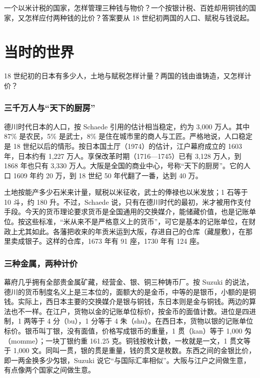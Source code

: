 一个以米计税的国家，怎样管理三种钱与物价？一个按银计税、百姓却用铜钱的国家，又怎样应付两种钱的比价？答案要从 18 世纪初两国的人口、赋税与钱说起。

\section{当时的世界}\label{sec:toku-world}

18 世纪初的日本有多少人，土地与赋税怎样计量？两国的钱由谁铸造，又怎样计价？

\subsubsection{三千万人与“天下的厨房”}
德川时代日本的人口，按 Schaede 引用的估计相当稳定，约为 3,000 万人。其中 87\% 是农民，5\% 是武士，8\% 是住在城市里的商人与工匠\cite{schaede1989}。严格地说，人口稳定是 18 世纪以后的情形。按日本国土厅（1974）的估计，江户幕府成立的 1603 年，日本约有 1,227 万人。享保改革时期（1716—1745）已有 3,128 万人，到 1868 年也只有 3,330 万人\cite{mlit2011}。大阪是全国的商业中心，号称“天下的厨房”。它的人口 1609 年约 20 万，到 18 世纪 50 年代翻了一番，达到 40 万\cite{schaede1989}。

土地按能产多少石米来计量，赋税以米征收，武士的俸禄也以米发放；1 石等于 10 斗，约 180 升\cite{schaede1989}。不过，Schaede 说，只有在德川时代的最初，米才被用作支付手段。今天的货币理论要求货币是全国通用的交换媒介，能储藏价值，也是记账单位。按这些标准，“米从来不是严格意义上的货币”，可它是基本的记账单位，在财政上尤其如此\cite{schaede1989}。各藩把收来的年贡米运到大阪，存进自己的仓库（藏屋敷），在那里卖成银子。这样的仓库，1673 年有 91 座，1730 年有 124 座\cite{schaede1989}。

\subsubsection{三种金属，两种计价}
幕府几乎拥有全部贵金属矿藏，经营金、银、铜三种铸币厂\cite{suzuki2021}。按 Suzuki 的说法，德川的货币制度名义上是三本位的，面额大的是金币，中等的是银币，小额的是铜钱。实际上，西日本主要的交换媒介是银与铜钱，东日本则是金与铜钱\cite{suzuki2021}。两边的算法也不一样。在江户，货物以金的记账单位标价，按金币的面值计数。进位是四进制，1 两等于 4 分（bu），1 分等于 4 朱（shu）\cite{suzuki2021}。在西日本，货物以银的记账单位标价。银币叫丁银，没有面值，价格写成银币的重量，1 贯（kan）等于 1,000 匁（momme）；一块丁银约重 161.25 克\cite{suzuki2021}。铜钱按枚计数，一枚就是一文，1 贯文等于 1,000 文\cite{suzuki2021}。同叫一贯，银的贯是重量，钱的贯文是枚数。东西之间的金银比价，即一两金换多少匁银，Suzuki 说它“与国际汇率相似”\cite{suzuki2021}。大阪与江户之间做生意，有点像两个国家之间做生意。

